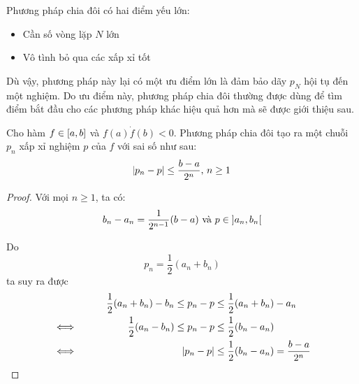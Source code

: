 \documentclass[../../Lectures.tex]{subfiles}
\begin{document}
Phương pháp chia đôi có hai điểm yếu lớn:

\begin{itemize}
    \item Cần số vòng lặp \(N\) lớn
    \item Vô tình bỏ qua các xấp xỉ tốt
\end{itemize}

Dù vậy, phương pháp này lại có một ưu điểm lớn là đảm bảo dãy \(p_N\) hội tụ đến
một nghiệm. Do ưu điểm này, phương pháp chia đôi thường được dùng để tìm điểm
bắt đầu cho các phương pháp khác hiệu quả hơn mà sẽ được giới thiệu sau.

\begin{theorem}
    Cho hàm \(f \in \interval{a}{b}\) và \(f(a) \dot f(b) < 0\). Phương pháp
    chia đôi tạo ra một chuỗi \(p_n\) xấp xỉ nghiệm \(p\) của \(f\) với sai số
    như sau:
    \[\abs{p_n - p} \leq \frac{b - a}{2^n} \text{, } n \geq 1\]
\end{theorem}

\begin{proof}
    Với mọi \(n \geq 1\), ta có:
    \[b_n - a_n = \frac{1}{2^{n - 1}} (b - a) \text{ và } p \in \interval[open]{a_n}{b_n}\]

    Do
    \[p_n = \frac{1}{2} (a_n + b_n)\]
    ta suy ra được
    \begin{align*}
        &\qquad& \frac{1}{2} (a_n + b_n) - b_n \leq p_n - p &\leq \frac{1}{2} (a_n + b_n) - a_n \\
        \iff&&   \frac{1}{2} (a_n - b_n)       \leq p_n - p &\leq \frac{1}{2} (b_n - a_n)       \\
        \iff&&                                \abs{p_n - p} &\leq \frac{1}{2} (b_n - a_n) = \frac{b - a}{2^n}
    \end{align*}
\end{proof}
\end{document}
